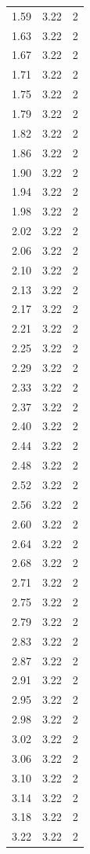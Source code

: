 \begin{longtable}{lrr}
  1.59 & 3.22 & 2 \\
  1.63 & 3.22 & 2 \\
  1.67 & 3.22 & 2 \\
  1.71 & 3.22 & 2 \\
  1.75 & 3.22 & 2 \\
  1.79 & 3.22 & 2 \\
  1.82 & 3.22 & 2 \\
  1.86 & 3.22 & 2 \\
  1.90 & 3.22 & 2 \\
  1.94 & 3.22 & 2 \\
  1.98 & 3.22 & 2 \\
  2.02 & 3.22 & 2 \\
  2.06 & 3.22 & 2 \\
  2.10 & 3.22 & 2 \\
  2.13 & 3.22 & 2 \\
  2.17 & 3.22 & 2 \\
  2.21 & 3.22 & 2 \\
  2.25 & 3.22 & 2 \\
  2.29 & 3.22 & 2 \\
  2.33 & 3.22 & 2 \\
  2.37 & 3.22 & 2 \\
  2.40 & 3.22 & 2 \\
  2.44 & 3.22 & 2 \\
  2.48 & 3.22 & 2 \\
  2.52 & 3.22 & 2 \\
  2.56 & 3.22 & 2 \\
  2.60 & 3.22 & 2 \\
  2.64 & 3.22 & 2 \\
  2.68 & 3.22 & 2 \\
  2.71 & 3.22 & 2 \\
  2.75 & 3.22 & 2 \\
  2.79 & 3.22 & 2 \\
  2.83 & 3.22 & 2 \\
  2.87 & 3.22 & 2 \\
  2.91 & 3.22 & 2 \\
  2.95 & 3.22 & 2 \\
  2.98 & 3.22 & 2 \\
  3.02 & 3.22 & 2 \\
  3.06 & 3.22 & 2 \\
  3.10 & 3.22 & 2 \\
  3.14 & 3.22 & 2 \\
  3.18 & 3.22 & 2 \\
  3.22 & 3.22 & 2 \\

\end{longtable}
